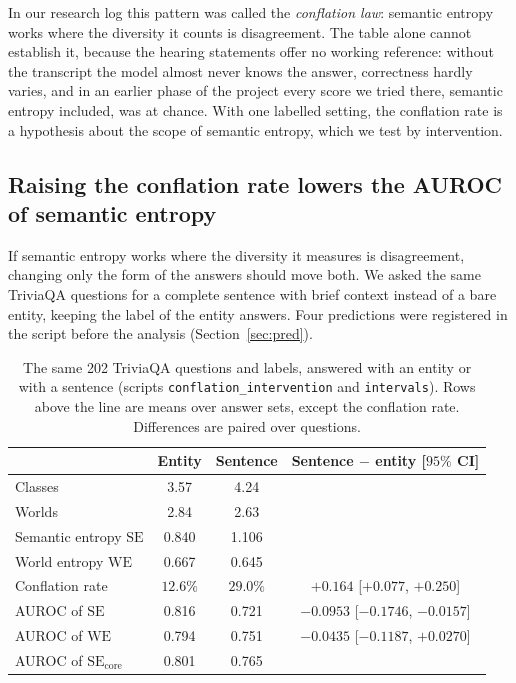 \documentclass[english]{desafiokunumi}
\theoremstyle{definition}
\theoremstyle{remark}
\newcommand{\SE}{\mathrm{SE}}
\newcommand{\SEc}{\mathrm{SE}_{\mathrm{core}}}
\newcommand{\WE}{\mathrm{WE}}
\begin{document}
In our research log this pattern was called the \emph{conflation law}: semantic
entropy works where the diversity it counts is disagreement. The table alone
cannot establish it, because the hearing statements offer no working
reference: without the transcript the model almost never knows the answer,
correctness hardly varies, and in an earlier phase of the project every score
we tried there, semantic entropy included, was at chance. With one labelled
setting, the conflation rate is a hypothesis about the scope of semantic
entropy, which we test by intervention.

\subsection{Raising the conflation rate lowers the AUROC of semantic entropy}
\label{sec:res-h5}

If semantic entropy works where the diversity it measures is disagreement,
changing only the form of the answers should move both. We asked the same
TriviaQA questions for a complete sentence with brief context instead of a bare
entity, keeping the label of the entity answers. Four predictions were
registered in the script before the analysis (Section~\ref{sec:pred}).

\begin{table}[ht]
  \centering
  \caption{The same 202 TriviaQA questions and labels, answered with an entity
  or with a sentence (scripts \texttt{conflation\_intervention} and \texttt{intervals}). Rows above the
  line are means over answer sets, except the conflation rate. Differences are
  paired over questions.}
  \label{tab:h5}
  \small
  \begin{tabular}{@{}lccc@{}}
    \toprule
     & \textbf{Entity} & \textbf{Sentence} & \textbf{Sentence $-$ entity} [$95\%$ CI] \\
    \midrule
    Classes                    & 3.57     & 4.24     & \\
    Worlds                     & 2.84     & 2.63     & \\
    Semantic entropy $\SE$     & 0.840    & 1.106    & \\
    World entropy $\WE$        & 0.667    & 0.645    & \\
    Conflation rate            & $12.6\%$ & $29.0\%$ & $+0.164$ [$+0.077$, $+0.250$] \\
    \midrule
    AUROC of $\SE$             & 0.816    & 0.721    & $-0.0953$ [$-0.1746$, $-0.0157$] \\
    AUROC of $\WE$             & 0.794    & 0.751    & $-0.0435$ [$-0.1187$, $+0.0270$] \\
    AUROC of $\SEc$            & 0.801    & 0.765    & \\
    \bottomrule
  \end{tabular}
\end{table}
\end{document}
